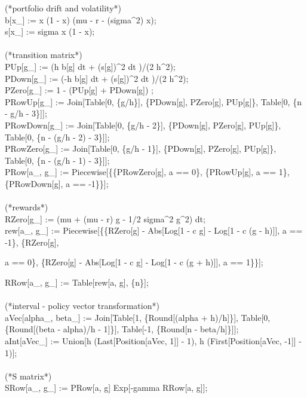 \begin{scriptsize}
  \begin{addmargin}[1em]{0em}
  (*portfolio drift and volatility*)\\
  b[x\_] := x (1 - x) (mu - r - (sigma\textasciicircum 2) x);\\
  s[x\_] := sigma x (1 - x);\\
  \\
  (*transition matrix*)\\
  PUp[g\_] := (h b[g] dt + (s[g])\textasciicircum 2 dt )/(2 h\textasciicircum 2);\\
  PDown[g\_] := (-h b[g] dt + (s[g])\textasciicircum 2 dt )/(2 h\textasciicircum 2);\\
  PZero[g\_] := 1 - (PUp[g] + PDown[g]) ;\\
  PRowUp[g\_] := Join[Table[0, \{g/h\}], \{PDown[g], PZero[g], PUp[g]\}, Table[0, \{n - g/h - 3\}]];\\
  PRowDown[g\_] := Join[Table[0, \{g/h - 2\}], \{PDown[g], PZero[g], PUp[g]\}, Table[0, \{n - (g/h - 2) - 3\}]];\\
  PRowZero[g\_] := Join[Table[0, \{g/h - 1\}], \{PDown[g], PZero[g], PUp[g]\}, Table[0, \{n - (g/h - 1) - 3\}]];\\
  PRow[a\_, g\_] := Piecewise[\{\{PRowZero[g], a == 0\}, \{PRowUp[g], a == 1\}, \{PRowDown[g], a == -1\}\}];\\
  \\
  (*rewards*)\\
  RZero[g\_] := (mu + (mu - r) g - 1/2 sigma\textasciicircum 2 g\textasciicircum 2) dt;\\
  rew[a\_, g\_] :=  Piecewise[\{\{RZero[g] - Abs[Log[1 - c g] - Log[1 - c (g - h)]], a == -1\}, \{RZero[g],
      \begin{addmargin}[1em]{0em} 
      a == 0\}, \{RZero[g] - Abs[Log[1 - c g] - Log[1 - c (g + h)]], a == 1\}\}];
      \end{addmargin}
  RRow[a\_, g\_] := Table[rew[a, g], \{n\}];\\
  \\
  (*interval - policy vector  transformation*)\\
  aVec[alpha\_, beta\_] := Join[Table[1, \{Round[(alpha + h)/h]\}], Table[0, \{Round[(beta - alpha)/h - 1]\}], Table[-1, \{Round[n - beta/h]\}]];\\
  aInt[aVec\_] := Union[h (Last[Position[aVec, 1]] - 1), h (First[Position[aVec, -1]] - 1)];\\
  \\
  (*S matrix*)\\
  SRow[a\_, g\_] := PRow[a, g] Exp[-gamma RRow[a, g]];\\

\end{addmargin}
\end{scriptsize}
